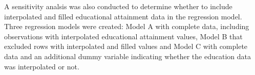 A sensitivity analsis was also conducted to determine whether to include interpolated and filled educational 
attainment data in the regression model. Three regression models were created: Model A with 
complete data, including observations with interpolated educational attainment values, Model B 
that excluded rows with interpolated and filled values and Model C with complete data and an additional 
dummy variable indicating whether the education data was interpolated or not.